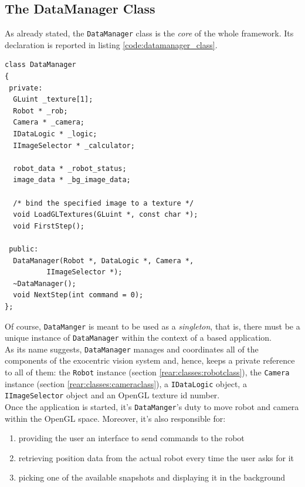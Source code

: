 \subsection{The DataManager Class}
\label{rear:classes:datamanager}

As already stated, the \texttt{DataManager} class is the \textit{core}
of the whole framework. Its declaration is reported in 
listing \ref{code:datamanager_class}.
\\
\begin{lstlisting}[caption={\texttt{DataManager} class declaration}, label={code:datamanager_class}]
class DataManager
{
 private:
  GLuint _texture[1];
  Robot * _rob;
  Camera * _camera;
  IDataLogic * _logic;
  IImageSelector * _calculator;

  robot_data * _robot_status;
  image_data * _bg_image_data;

  /* bind the specified image to a texture */
  void LoadGLTextures(GLuint *, const char *);
  void FirstStep();

 public:
  DataManager(Robot *, DataLogic *, Camera *, 
	      IImageSelector *); 
  ~DataManager();
  void NextStep(int command = 0);
};
\end{lstlisting}

Of course, \texttt{DataManger} is meant to be used as a \textit{singleton}, 
that is, there must be a unique instance of \texttt{DataManager} 
within the context of a \framework{} based application.
\\
As its name suggests, \texttt{DataManager} manages and coordinates 
all of the components of the exocentric vision system and, hence, 
keeps a private reference to all of them: 
the \texttt{Robot} instance (section \ref{rear:classes:robotclass}), the 
\texttt{Camera} instance (section \ref{rear:classes:cameraclass}),
a \texttt{IDataLogic} object, a \texttt{IImageSelector} 
object and an OpenGL texture id number.
\\
Once the application is started, it's \texttt{DataManger}'s duty 
to move robot and camera within the OpenGL space. Moreover, 
it's also responsible for:

\begin{enumerate}
  \item providing the user an interface 
    to send commands to the robot
  \item retrieving position 
    data from the actual robot every time the user asks 
    for it
  \item picking one of the available snapshots and 
    displaying it in the background
\end{enumerate}


